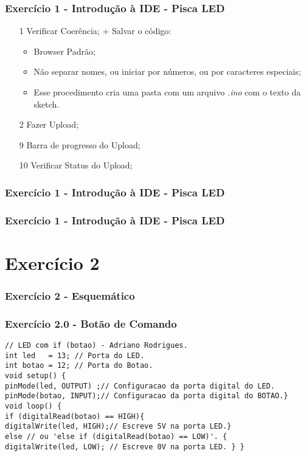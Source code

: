 \documentclass{beamer}
\begin{document}
\begin{frame}
	\frametitle{Exercício 1 - Introdução à IDE - Pisca LED}
	\begin{center}
	\end{center}
	\begin{itemize}
		\item[1] Verificar Coerência; + Salvar o código:
		\begin{itemize}
			\item Browser Padrão;
			\item Não separar nomes, ou iniciar por números, ou por caracteres especiais;
			\item Esse procedimento cria uma pasta com um arquivo \textit{.ino} com o texto da sketch.
		\end{itemize}
		\item[2] Fazer Upload;
		\item[9] Barra de progresso do Upload;
		\item[10] Verificar Status do Upload;
	\end{itemize}
\end{frame}

\begin{frame}
	\frametitle{Exercício 1 - Introdução à IDE - Pisca LED}
	\begin{center}
	\end{center}
\end{frame}

\begin{frame}
	\frametitle{Exercício 1 - Introdução à IDE - Pisca LED}
	\begin{center}
	\end{center}
\end{frame}

\section{Exercício 2}
\begin{frame}
	\frametitle{Exercício 2 - Esquemático}
	\begin{center}
	\end{center}
\end{frame}

\begin{frame}[fragile]
	\frametitle{Exercício 2.0 - Botão de Comando}
	
	\begin{lstlisting}[style=Arduino]
// LED com if (botao) - Adriano Rodrigues.
int led   = 13; // Porta do LED.
int botao = 12; // Porta do Botao.
void setup() {
pinMode(led, OUTPUT) ;// Configuracao da porta digital do LED.
pinMode(botao, INPUT);// Configuracao da porta digital do BOTAO.}
void loop() {
if (digitalRead(botao) == HIGH){
digitalWrite(led, HIGH);// Escreve 5V na porta LED.}
else // ou 'else if (digitalRead(botao) == LOW)'. {
digitalWrite(led, LOW); // Escreve 0V na porta LED. } } 	\end{lstlisting}
\end{frame}
\end{document}

